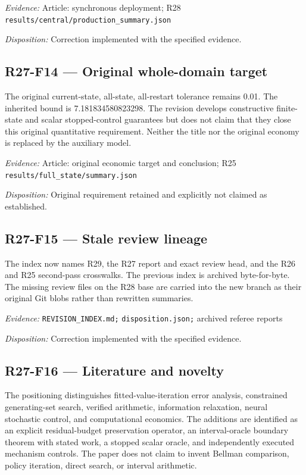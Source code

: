 \emph{Evidence:} Article: synchronous deployment; R28 \nolinkurl{results/central/production_summary.json}

\emph{Disposition:} Correction implemented with the specified evidence.
\subsection{R27-F14 --- Original whole-domain target}
The original current-state, all-state, all-restart tolerance remains 0.01. The inherited bound is 7.181834580823298. The revision develops constructive finite-state and scalar stopped-control guarantees but does not claim that they close this original quantitative requirement. Neither the title nor the original economy is replaced by the auxiliary model.

\emph{Evidence:} Article: original economic target and conclusion; R25 \nolinkurl{results/full_state/summary.json}

\emph{Disposition:} Original requirement retained and explicitly not claimed as established.
\subsection{R27-F15 --- Stale review lineage}
The index now names R29, the R27 report and exact review head, and the R26 and R25 second-pass crosswalks. The previous index is archived byte-for-byte. The missing review files on the R28 base are carried into the new branch as their original Git blobs rather than rewritten summaries.

\emph{Evidence:} \nolinkurl{REVISION_INDEX.md;} \nolinkurl{disposition.json;} archived referee reports

\emph{Disposition:} Correction implemented with the specified evidence.
\subsection{R27-F16 --- Literature and novelty}
The positioning distinguishes fitted-value-iteration error analysis, constrained generating-set search, verified arithmetic, information relaxation, neural stochastic control, and computational economics. The additions are identified as an explicit residual-budget preservation operator, an interval-oracle boundary theorem with stated work, a stopped scalar oracle, and independently executed mechanism controls. The paper does not claim to invent Bellman comparison, policy iteration, direct search, or interval arithmetic.

